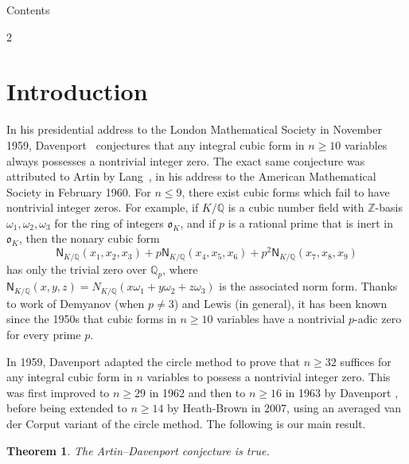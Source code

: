 \documentclass[a4paper,11pt, twoside,reqno]{amsart}
\theoremstyle{plain}
\newtheorem{thm}{Theorem}[section]
\theoremstyle{definition}
\theoremstyle{remark}
\newcommand{\ZZ}{\mathbb{Z}}
\newcommand{\QQ}{\mathbb{Q}}
\renewcommand{\leq}{\leqslant}
\renewcommand{\geq}{\geqslant}
\numberwithin{equation}{section}
\begin{document}
\thispagestyle{empty}
\setcounter{tocdepth}{1}


\begin{center}
  \contentsnamefont Contents
\end{center}
{\small
\begin{multicols}{2}
\tableofcontents

\end{multicols}
}




\section{Introduction}
\label{sec:intro}




In his  
presidential address to the London Mathematical Society 
in November 1959, 
Davenport~\cite{Dav60} conjectures that any integral cubic form in $n\geq 10$ variables always possesses a nontrivial integer zero. 
The exact same conjecture was attributed to Artin by Lang~\cite{lang}, in his address to the
American Mathematical Society in February 1960.  
For $n\leq 9$,  there exist cubic forms which fail to have 
nontrivial integer zeros. For example, 
if $K/\QQ$ is a cubic number field with 
$\ZZ$-basis $\omega_1,\omega_2,\omega_3$ for the ring of integers $\mathfrak{o}_K$, and if 
$p$ is a rational prime that is inert in $\mathfrak{o}_K$, then the nonary cubic form 
$$
\mathsf{N}_{K/\QQ}(x_1,x_2,x_3)+p\mathsf{N}_{K/\QQ}(x_{4},x_5,x_6)+p^{2}\mathsf{N}_{K/\QQ}(x_{7},x_8,x_9)
$$
has only the trivial zero over $\QQ_p$, where
$\mathsf N_{K/\QQ}(x,y,z)=N_{K/\QQ}(x\omega_1+y\omega_2+z\omega_3)$
is the associated norm form.
Thanks to work of Demyanov \cite{dem} (when $p\neq 3$) and Lewis \cite{lewis} (in general), it has been known since the 1950s that cubic forms in $n\geq 10$ variables have a nontrivial $p$-adic zero for every prime $p$.


In 1959, Davenport \cite{Dav59} adapted the circle method to prove that $n\geq 32$ suffices for 
any integral cubic form in $n$ variables to possess a nontrivial integer zero.
This was first improved to $n\geq 29$ in 1962 and then to $n\geq 16$ in 1963 by Davenport \cite{Dav62, Dav63}, before being extended to $n\geq 14$ by Heath-Brown \cite{HB07} in 2007, using an averaged van der Corput variant of the circle method. The following is our main result.

\begin{thm}
\label{thm:main}
The Artin--Davenport conjecture is true. 
\end{thm}
\end{document}
